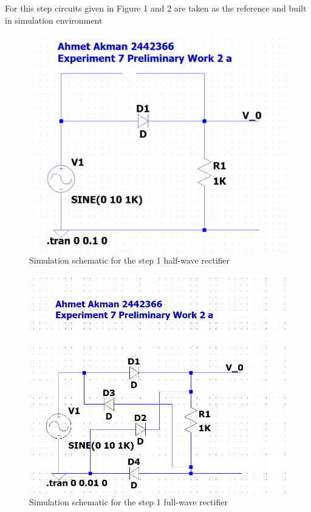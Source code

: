 \documentclass[letterpaper,12pt]{article}
\begin{document}
For this step circuits given in Figure 1 and 2 are taken as the reference and built in simulation environment
\begin{figure}[H]
	\centering
   \includegraphics[width=1\textwidth]{Pre1a_sch.png}
   \caption{Simulation schematic for the step 1 half-wave rectifier}
\end{figure} 
\begin{figure}[H]
	\centering
   \includegraphics[width=1\textwidth]{Pre1a2_sch.png}
   \caption{Simulation schematic for the step 1 full-wave rectifier}
\end{figure} 
\end{document}
